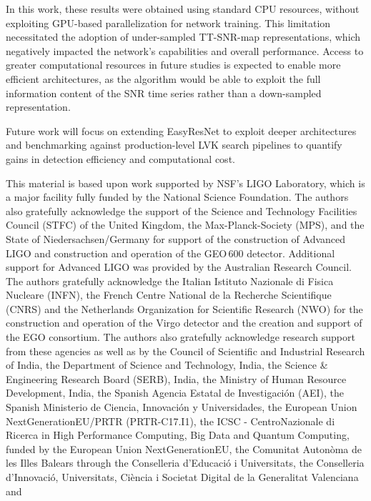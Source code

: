 \documentclass[aps,prd,twocolumn,superscriptaddress,nofootinbib, longbibliography]{revtex4-2}
\begin{document}
	In this work, these results were obtained using standard CPU resources, without exploiting GPU-based parallelization for network training. This limitation necessitated the adoption of under-sampled TT-SNR-map representations, which negatively impacted the network's capabilities and overall performance. Access to greater computational resources in future studies is expected to enable more efficient architectures, as the algorithm would be able to exploit the full information content of the SNR time series rather than a down-sampled representation.
	
	Future work will focus on extending EasyResNet to exploit deeper architectures and benchmarking against production-level LVK search pipelines to quantify gains in detection efficiency and computational cost.

\begin{acknowledgments}
This material is based upon work supported by NSF's LIGO Laboratory, which is a
major facility fully funded by the National Science Foundation.
The authors also gratefully acknowledge the support of
the Science and Technology Facilities Council (STFC) of the
United Kingdom, the Max-Planck-Society (MPS), and the State of
Niedersachsen/Germany for support of the construction of Advanced LIGO 
and construction and operation of the GEO\,600 detector. 
Additional support for Advanced LIGO was provided by the Australian Research Council.
The authors gratefully acknowledge the Italian Istituto Nazionale di Fisica Nucleare (INFN),  
the French Centre National de la Recherche Scientifique (CNRS) and
the Netherlands Organization for Scientific Research (NWO)
for the construction and operation of the Virgo detector
and the creation and support  of the EGO consortium. 
The authors also gratefully acknowledge research support from these agencies as well as by 
the Council of Scientific and Industrial Research of India, 
the Department of Science and Technology, India,
the Science \& Engineering Research Board (SERB), India,
the Ministry of Human Resource Development, India,
the Spanish Agencia Estatal de Investigaci\'on (AEI),
the Spanish Ministerio de Ciencia, Innovaci\'on y Universidades,
the European Union NextGenerationEU/PRTR (PRTR-C17.I1),
the ICSC - CentroNazionale di Ricerca in High Performance Computing, Big Data
and Quantum Computing, funded by the European Union NextGenerationEU,
the Comunitat Auton\`oma de les Illes Balears through the Conselleria d'Educaci\'o i Universitats,
the Conselleria d'Innovaci\'o, Universitats, Ci\`encia i Societat Digital de la Generalitat Valenciana and

\end{acknowledgments}
\end{document}
